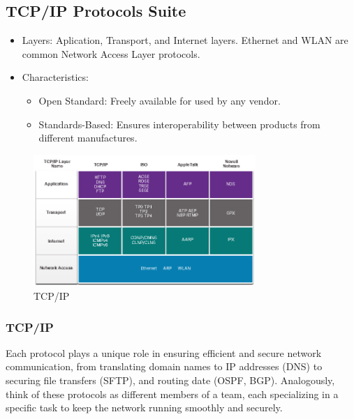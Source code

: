 \documentclass[a4paper,11pt]{article}
\begin{document}
\subsection{TCP/IP Protocols Suite}
\begin{itemize}
    \item Layers: Aplication, Transport, and Internet layers. Ethernet and WLAN are common Network Access Layer protocols.\\
    \item Characteristics:\\
    \begin{itemize}
        \item Open Standard: Freely available for used by any vendor.\\
        \item Standards-Based: Ensures interoperability between products from different manufactures.\\
    \end{itemize}
\end{itemize}

\begin{figure}[h!]
    \centering
    \includegraphics[width=0.75\textwidth]{4.png}
    \caption{TCP/IP}
    \label{fig:cap1}
\end{figure}

\subsubsection{TCP/IP}
Each protocol plays a unique role in ensuring efficient and secure network communication, from translating domain names to IP addresses (DNS) to securing file transfers (SFTP), and routing date (OSPF, BGP). Analogously, think of these protocols as different members of a team, each specializing in a specific task to keep the network running smoothly and securely.\\
\end{document}
